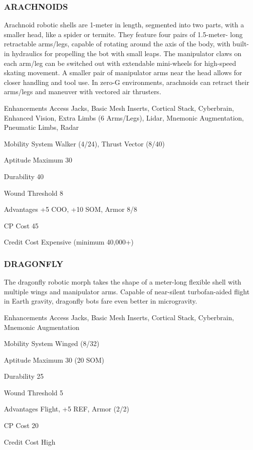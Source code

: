\subsubsection{ARACHNOIDS}
Arachnoid robotic shells are 1-meter in length, segmented into two parts, with
a smaller head, like a spider or termite. They feature four pairs of 1.5-meter-
long retractable arms/legs, capable of rotating around the axis of the body,
with built-in hydraulics for propelling the bot with small leaps. The
manipulator claws on each arm/leg can be switched out with extendable
mini-wheels for high-speed skating movement. A smaller pair of manipulator arms
near the head allows for closer handling and tool use. In zero-G environments,
arachnoids can retract their arms/legs and maneuver with vectored air
thrusters.

\begin{description*}
\item[Enhancements] Access Jacks, Basic Mesh Inserts, Cortical Stack,
  Cyberbrain, Enhanced Vision, Extra Limbs (6 Arms/Legs), Lidar, Mnemonic
  Augmentation, Pneumatic Limbs, Radar
\item[Mobility System] Walker (4/24), Thrust Vector (8/40) 
\item[Aptitude Maximum] 30 
\item[Durability] 40 
\item[Wound Threshold] 8 
\item[Advantages] +5 COO, +10 SOM, Armor 8/8 
\item[CP Cost] 45 
\item[Credit Cost] Expensive (minimum 40,000+) 
\end{description*}

\subsubsection{DRAGONFLY}
The dragonfly robotic morph takes the shape of a meter-long flexible shell with
multiple wings and manipulator arms. Capable of near-silent turbofan-aided
flight in Earth gravity, dragonfly bots fare even better in microgravity.

\begin{description*}
\item[Enhancements] Access Jacks, Basic Mesh Inserts, Cortical Stack,
  Cyberbrain, Mnemonic Augmentation
\item[Mobility System]  Winged (8/32) 
\item[Aptitude Maximum]  30 (20 SOM) 
\item[Durability]  25 
\item[Wound Threshold]  5 
\item[Advantages]  Flight, +5 REF, Armor (2/2)
\item[CP Cost]  20 
\item[Credit Cost] High
\end{description*}

